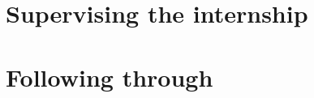 \documentclass[t, 11pt,xcolor=dvipsnames]{beamer}
\begin{document}
\section{Supervising the internship}

\section{Following through}

	
%
\end{document}
